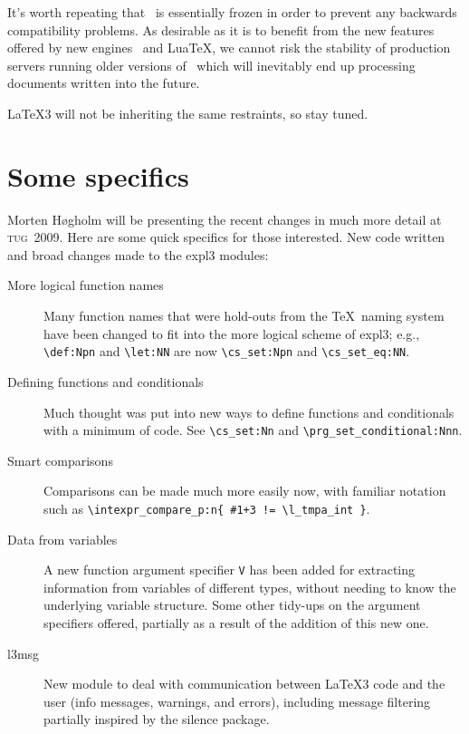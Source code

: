 \documentclass{ltnews}
\newcommand\TUG[1]{\textsc{tug}~#1}
\begin{document}
It's worth repeating that \LaTeXe\ is essentially frozen in order to
prevent any backwards compatibility problems. As desirable as it is
to benefit from the new features offered by new engines \XeTeX\ and
Lua\TeX, we cannot risk the stability of production servers running
older versions of \LaTeXe\ which will inevitably end up processing
documents written into the future.

\LaTeX3 will not be inheriting the same restraints, so stay tuned.

\newpage

\section{Some specifics}

Morten H\o gholm will be presenting the recent changes in much more detail at
\TUG{2009}. Here are some quick specifics for those interested. New code written
and broad changes made to the \textsf{expl3} modules:
\begin{description}
\item [More logical function names]
  Many function names that were hold-outs from the \TeX\ naming system
  have been changed to fit into the more logical scheme of \textsf{expl3}; e.g.,
  \verb|\def:Npn| and \verb|\let:NN| are now \verb|\cs_set:Npn| and 
  \verb|\cs_set_eq:NN|.
  
\item [Defining functions and conditionals] 
  Much thought was put into new ways to define
  functions and conditionals with a minimum of code.
  See \verb|\cs_set:Nn| and \verb|\prg_set_conditional:Nnn|.
  
\item [Smart comparisons] 
  Comparisons can be made much more easily now, with familiar notation such as
  \verb|\intexpr_compare_p:n{ #1+3 != \l_tmpa_int }|.
  
\item [Data from variables] A new function argument specifier \texttt{V} has
  been added for extracting information from variables of different types,
  without needing to know the underlying variable structure. Some other
  tidy-ups on the argument specifiers offered, partially as a result of the
  addition of this new one.
  
\item [l3msg] New module to deal with communication between \LaTeX3 code
  and the user (info messages, warnings, and errors), including message
  filtering partially inspired by the \textsf{silence} package.
  \end{description}
\end{document}
